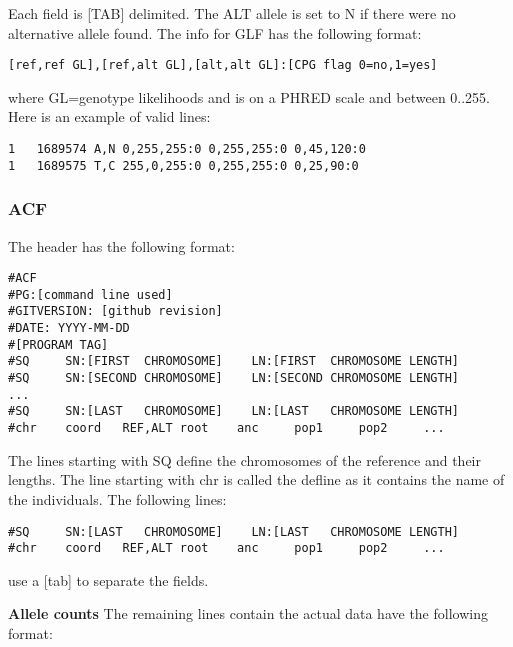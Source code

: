 \documentclass[a4paper]{article}
\begin{document}
\noindent  Each field is [TAB] delimited. The ALT allele is set to N if there were no alternative allele found. The info for GLF has the following format:

\begin{verbatim}
[ref,ref GL],[ref,alt GL],[alt,alt GL]:[CPG flag 0=no,1=yes]
\end{verbatim}

\noindent where GL=genotype likelihoods and is on a PHRED scale and between 0..255. Here is an example of valid lines:

\begin{verbatim}
1	1689574	A,N	0,255,255:0	0,255,255:0	0,45,120:0
1	1689575	T,C	255,0,255:0	0,255,255:0	0,25,90:0
\end{verbatim}

\subsubsection{ACF} 

\label{text:acf}
\noindent The header has the following format:

\begin{verbatim}
#ACF
#PG:[command line used]
#GITVERSION: [github revision]
#DATE: YYYY-MM-DD
#[PROGRAM TAG]
#SQ     SN:[FIRST  CHROMOSOME]    LN:[FIRST  CHROMOSOME LENGTH]
#SQ     SN:[SECOND CHROMOSOME]    LN:[SECOND CHROMOSOME LENGTH]
...
#SQ     SN:[LAST   CHROMOSOME]    LN:[LAST   CHROMOSOME LENGTH]
#chr    coord   REF,ALT root    anc     pop1     pop2     ...
\end{verbatim}


\noindent The lines starting with  SQ define the chromosomes of the reference and their lengths. The line starting with chr is called the defline as it contains the name of the individuals. The following lines:


\begin{verbatim}
#SQ     SN:[LAST   CHROMOSOME]    LN:[LAST   CHROMOSOME LENGTH]
#chr    coord   REF,ALT root    anc     pop1     pop2     ...
\end{verbatim}

\noindent use a [tab] to separate the fields. 

\noindent \textbf{Allele counts}
\noindent The remaining lines contain the actual data have the following format:
\end{document}
